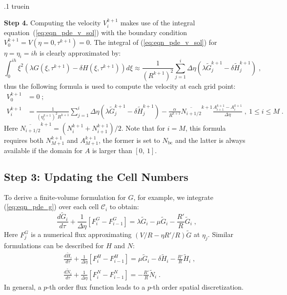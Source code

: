 \documentclass{amsart}
\theoremstyle{definition}
\theoremstyle{remark}
\numberwithin{equation}{section}
\numberwithin{figure}{section}
\begin{document}
\vglue .1 truein

\noindent
{\bf Step 4.} Computing the velocity $V_i^{k+1}$ makes use of the integral equation~(\ref{eq:eqn_pde_v_sol}) with the boundary condition $V_0^{k+1} = V(\eta=0,\tau^{k+1}) = 0$.
The integral of (\ref{eq:eqn_pde_v_sol}) for $\eta=\eta_i=ih$ is clearly approximated by:
\begin{displaymath}
\int_0^{ih}\xi^2(\lambda G(\xi,\tau^{k+1})-\delta H(\xi,\tau^{k+1}))d\xi
\approx \frac{1}{(R^{k+1})^2}\sum_{j=1}^i\Delta\eta\left(\lambda\tilde{G}_j^{k+1}-\delta\tilde{H}_j^{k+1}\right)\;,
\end{displaymath}
thus the following formula is used to compute the velocity at each grid point:
\begin{align}
\label{eq:num_gen_v_0}
V_0^{k+1} &= 0\;; \\
\label{eq:num_gen_v_i}
V_i^{k+1} &= \frac{1}{(\eta_i^{k+1})^2R^{k+1}}\sum_{j=1}^i\Delta\eta\left(\lambda\tilde{G}_j^{k+1}-\delta\tilde{H}_j^{k+1}\right) - \frac{\alpha}{R^{k+1}}\overline{N_{i+1/2}}^{k+1}\frac{A_{i+1}^{k+1}-A_i^{k+1}}{\Delta\eta}\;,\ 1\le i\le M\;.
\end{align}
Here $\overline{N_{i+1/2}}^{k+1} = (N_i^{k+1}+N_{i+1}^{k+1})/2$.
Note that for $i=M$, this formula requires both $N_{M+1}^{k+1}$ and $A_{M+1}^{k+1}$, the former is set to $N_{\textrm{bc}}$ and the latter is always available if the domain for $A$ is larger than $[0,\ 1]$.

\subsection{Step 3: Updating the Cell Numbers}
To derive a finite-volume formulation for $G$, for example, we integrate (\ref{eq:eqn_pde_g}) over each cell $\mathcal{C}_i$ to obtain:
\begin{displaymath}
\frac{d\tilde{G}_i}{d\tau} + \frac{1}{\Delta\eta}\left[F^G_{i}-F^G_{i-1}\right] = \lambda\tilde{G}_i-\mu\tilde{G}_i-\frac{R'}{R}\tilde{G}_i\;,
\end{displaymath}
Here $F_j^G$ is a numerical flux approximating $(V/R-\eta R'/R)\tilde{G}$ at $\eta_j$.
Similar formulations can be described for $H$ and $N$:
\begin{align*}
&\frac{d\tilde{H}_i}{d\tau} + \frac{1}{\Delta\eta}\left[F^H_{i}-F^H_{i-1}\right] = \mu\tilde{G}_i-\delta\tilde{H}_i-\frac{R'}{R}\tilde{H}_i\;,\\
&\frac{d\tilde{N}_i}{d\tau} + \frac{1}{\Delta\eta}\left[F^N_{i}-F^N_{i-1}\right] = -\frac{R'}{R}\tilde{N}_i\;.
\end{align*}
In general, a $p$-th order flux function leads to a $p$-th order spatial discretization.
\end{document}
